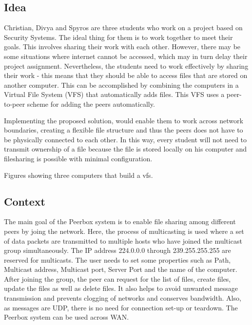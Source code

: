 
\subsection{Idea}

Christian, Divya and Spyros are three students who work on a project based on Security Systems. The ideal thing for them is to work together to meet their goals. This involves sharing their work with each other. However, there may be some situations where internet cannot be accessed, which may in turn delay their project assignment. Nevertheless, the students need to work effectively by sharing their work - this means that they should be able to access files that are stored on another computer. This can be accomplished by combining the computers in a Virtual File System (VFS) that automatically adds files. This VFS uses a peer-to-peer scheme for adding the peers automatically.

Implementing the proposed solution, would  enable them to work across network boundaries, creating a flexible file structure and thus the peers does not have to be physically connected to each other. In this way, every student will not need to transmit ownership of a file because the file is stored locally on his computer and filesharing is possible with minimal configuration. 



Figures showing three computers that build a vfs.


\subsection{Context}
The main goal of the Peerbox system is to enable file sharing among different peers by joing the network. Here, the process of multicasting is used where a set of data packets are transmitted to  multiple hosts who have joined the multicast group simultaneously. The IP address 224.0.0.0 through 239.255.255.255 are reserved for multicasts. The user needs to set some properties such as Path, Multicast address, Multicast port, Server Port and the name of the computer. After joining the group, the peer can request for the list of files, create files, update the files as well as delete files. It also helps to avoid unwanted message transmission and prevents clogging of networks and conserves bandwidth. Also, as messages are UDP, there is no need for connection set-up or teardown. The Peerbox system can be used across WAN.  


